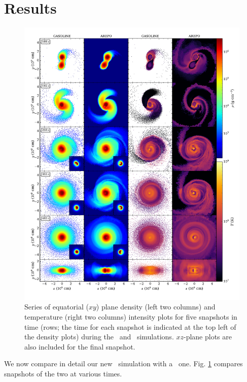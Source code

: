 \section{Results}
\label{sec:c3_results}


\begin{figure}
\centering
\includegraphics[angle=0,width=1.0\columnwidth]{chapter3_zhu+u/figures/snapshots.pdf}
\caption{Series of equatorial ($xy$) plane density (left two columns) and temperature (right two columns) intensity plots for five snapshots in time (rows; the time for each snapshot is indicated at the top left of the density plots) during the \gasoline\ and \arepo\ simulations.  $xz$-plane plots are also included for the final snapshot.}
\label{fig:c3_diagslice}
\end{figure}

We now compare in detail our new \arepo\ simulation with a \gasoline\ one.  Fig. \ref{fig:c3_diagslice} compares snapshots of the two at various times.

